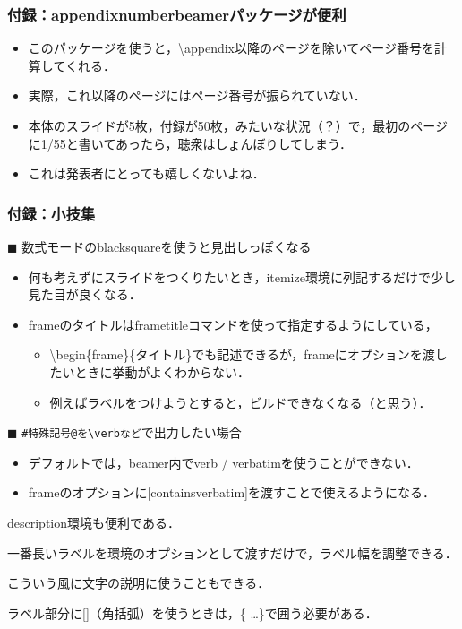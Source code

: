 \documentclass[unicode, 9pt, aspectratio=169]{beamer}
\begin{document}
\appendix

\begin{frame}
\frametitle{付録：appendixnumberbeamerパッケージが便利}
\begin{itemize}
    \item このパッケージを使うと，\backslash appendix以降のページを除いてページ番号を計算してくれる．
    \item 実際，これ以降のページにはページ番号が振られていない．
    \item 本体のスライドが5枚，付録が50枚，みたいな状況（？）で，最初のページに1/55と書いてあったら，聴衆はしょんぼりしてしまう．
    \item[＊] これは発表者にとっても嬉しくないよね．
\end{itemize}
\end{frame}

\begin{frame}[containsverbatim]
\frametitle{付録：小技集}
$\blacksquare$ 数式モードのblacksquareを使うと見出しっぽくなる
\begin{itemize}
    \item 何も考えずにスライドをつくりたいとき，itemize環境に列記するだけで少し見た目が良くなる．
    \item frameのタイトルはframetitleコマンドを使って指定するようにしている，
    \begin{itemize}
        \item \backslash begin\{frame\}\{タイトル\}でも記述できるが，frameにオプションを渡したいときに挙動がよくわからない．
        \item 例えばラベルをつけようとすると，ビルドできなくなる（と思う）．
    \end{itemize}
\end{itemize}

$\blacksquare$ \verb+#特殊記号@を\verbなど+で出力したい場合
\begin{itemize}
    \item デフォルトでは，beamer内でverb / verbatimを使うことができない．
    \item frameのオプションに[containsverbatim]を渡すことで使えるようになる．
\end{itemize}

\begin{block}{}
\begin{description}[ラベルの長さ]
    \item[ラベル] description環境も便利である．
    \item[ラベルの長さ] 一番長いラベルを環境のオプションとして渡すだけで，ラベル幅を調整できる．
    \item[{$x \in [0, 1]$}] こういう風に文字の説明に使うこともできる．
    \item[注意点] ラベル部分に[]（角括弧）を使うときは，\{ \dots \}で囲う必要がある．
\end{description}
\end{block}
\end{frame}
\end{document}
